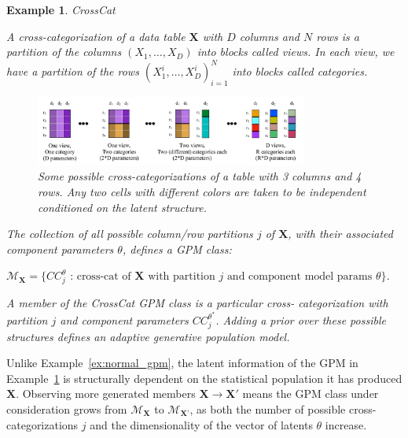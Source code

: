 \documentclass[10pt,letterpaper]{article}
\newtheorem{example}{Example}[section]
\newcommand{\set}[1]{\{#1\}}
\begin{document}
\begin{example} \label{ex:crosscat} CrossCat

A cross-categorization of a data table $\mathbf{X}$ with $D$ columns and $N$ 
rows is
a partition of the columns $(X_1,\dots,X_D)$ into blocks called \textit{views}.
In each view, we have a partition of the rows $(X_1^{i},\dots,X_D^{i})_{i=1}^N$
into blocks called \textit{categories}.

\begin{figure}[ht]
    \centering
\includegraphics[width=0.8\textwidth]{cc.jpeg}
\caption{Some possible cross-categorizations of a table with 3 columns
  and 4 rows.  Any two cells with different colors are taken to be
  independent conditioned on the latent structure.}
\label{fig:cc}
\end{figure}
The collection of all possible column/row partitions $j$ of
$\mathbf{X}$, with their associated component parameters $\theta$,
defines a GPM class:

$\mathcal{M}_\textbf{X} = \set{CC_j^{\theta} \text{ : cross-cat of } \mathbf{X}
\text{ with partition } j \text{ and component model params } \theta}$.

A member of the CrossCat GPM class is a particular
cross- categorization with partition $j$ and component parameters
$CC_j^{\theta^*}$.  Adding a prior over these possible structures
defines an adaptive generative population model.
\end{example}

Unlike Example~\ref{ex:normal_gpm}, the latent information of the GPM
in Example~\ref{ex:crosscat} is structurally dependent on
the statistical population it has produced $\mathbf{X}$. Observing more
generated members $\mathbf{X} \to
\mathbf{X}'$ means the GPM class under consideration grows from
$\mathcal{M}_\textbf{X}$ to $\mathcal{M}_\textbf{X'}$, as both the number of
possible cross-categorizations $j$ and the dimensionality of the vector of
latents $\theta$ increase.

\end{document}
